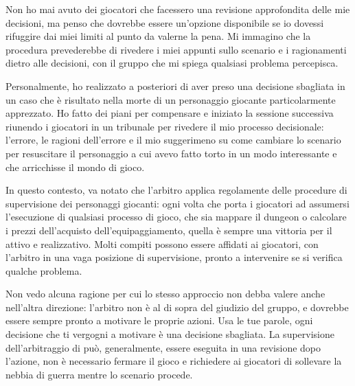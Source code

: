 Non ho mai avuto dei giocatori che facessero una revisione approfondita delle mie decisioni, ma penso che dovrebbe essere un'opzione disponibile se io dovessi rifuggire dai miei limiti al punto da valerne la pena. Mi immagino che la procedura prevederebbe di rivedere i miei appunti sullo scenario e i ragionamenti dietro alle decisioni, con il gruppo che mi spiega qualsiasi problema percepisca.

Personalmente, ho realizzato a posteriori di aver preso una decisione sbagliata in un caso che è risultato nella morte di un personaggio giocante particolarmente apprezzato. Ho fatto dei piani per compensare e iniziato la sessione successiva riunendo i giocatori in un tribunale per rivedere il mio processo decisionale: l'errore, le ragioni dell'errore e il mio suggerimeno su come cambiare lo scenario per resuscitare il personaggio a cui avevo fatto torto in un modo interessante e che arricchisse il mondo di gioco.

In questo contesto, va notato che l'arbitro applica regolamente delle procedure di supervisione dei personaggi giocanti: ogni volta che porta i giocatori ad assumersi l'esecuzione di qualsiasi processo di gioco, che sia mappare il dungeon o calcolare i prezzi dell'acquisto dell'equipaggiamento, quella è sempre una vittoria per il  attivo e realizzativo. Molti compiti possono essere affidati ai giocatori, con l'arbitro in una vaga posizione di supervisione, pronto a intervenire se si verifica qualche problema.

Non vedo alcuna ragione per cui lo stesso approccio non debba valere anche nell'altra direzione: l'arbitro non è al di sopra del giudizio del gruppo, e dovrebbe essere sempre pronto a motivare le proprie azioni. Usa le tue parole, ogni decisione che ti vergogni a motivare è una decisione sbagliata. La supervisione dell'arbitraggio di \dnd{} può, generalmente, essere eseguita in una revisione dopo l'azione, non è necessario fermare il gioco e richiedere ai giocatori di sollevare la nebbia di guerra mentre lo scenario procede.